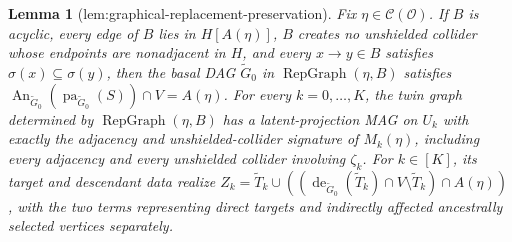 \documentclass{article}
\newtheorem{lemma}{Lemma}
\begin{document}
\begin{lemma}[lem:graphical-replacement-preservation]\label{lem:graphical-replacement-preservation}
Fix \(\eta\in\mathcal C(\mathcal O)\). If \(B\) is acyclic, every edge of \(B\) lies in \(H[A(\eta)]\), \(B\) creates no unshielded collider whose endpoints are nonadjacent in \(H\), and every \(x\to y\in B\) satisfies \(\sigma(x)\subseteq\sigma(y)\), then the basal DAG \(\widetilde G_0\) in \(\operatorname{RepGraph}(\eta,B)\) satisfies \(\operatorname{An}_{\widetilde G_0}(\operatorname{pa}_{\widetilde G_0}(S))\cap V=A(\eta)\). For every \(k=0,\ldots,K\), the twin graph determined by \(\operatorname{RepGraph}(\eta,B)\) has a latent-projection MAG on \(U_k\) with exactly the adjacency and unshielded-collider signature of \(M_k(\eta)\), including every adjacency and every unshielded collider involving \(\zeta_k\). For \(k\in[K]\), its target and descendant data realize \(Z_k=\widetilde T_k\cup((\operatorname{de}_{\widetilde G_0}(\widetilde T_k)\cap V\setminus\widetilde T_k)\cap A(\eta))\), with the two terms representing direct targets and indirectly affected ancestrally selected vertices separately.
\end{lemma}
\end{document}
